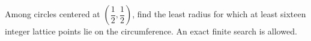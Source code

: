 Among circles centered at $(\dfrac{1}{2},\dfrac{1}{2})$, find the least radius for which at least sixteen integer lattice points lie on the circumference. An exact finite search is allowed.
